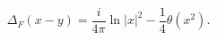 \begin{equation}
\label{feynprop}
\Delta_F(x-y)=\frac{i}{4\pi}\ln |x|^2-\frac{1}{4}\theta (x^2).
\end{equation}

